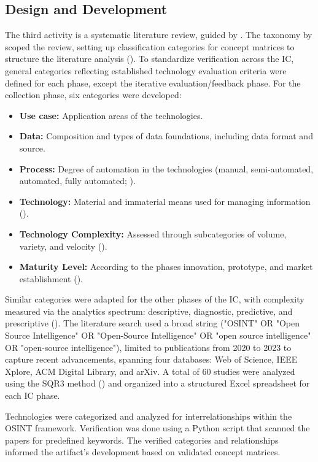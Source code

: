 \documentclass[10pt]{article}
\begin{document}
\subsection{Design and Development}
The third activity is a systematic literature review, guided by \textcite{Cleven.2009}.  The taxonomy by \cite{Cooper.1988} scoped the review, setting up classification categories for concept matrices to structure the literature analysis (\cite{Webster.2002}).
To standardize verification across the IC, general categories reflecting established technology evaluation criteria were defined for each phase, except the iterative evaluation/feedback phase. For the collection phase, six categories were developed:
\begin{itemize}
    \item \textbf{Use case:} Application areas of the technologies.
    \item \textbf{Data:} Composition and types of data foundations, including data format and source.
    \item \textbf{Process:} Degree of automation in the technologies (manual, semi-automated, automated, fully automated; \cite{Duncheon.2002, Billings.1997, Endsley.1999}).
    \item \textbf{Technology:} Material and immaterial means used for managing information (\cite{Bleck.2004}).
    \item \textbf{Technology Complexity:} Assessed through subcategories of volume, variety, and velocity (\cite{Elgendy.2014}).
    \item \textbf{Maturity Level:} According to the phases innovation, prototype, and  market establishment (\cite{Stich.2022}).
\end{itemize}

Similar categories were adapted for the other phases of the IC, with complexity measured via the analytics spectrum: descriptive, diagnostic, predictive, and prescriptive (\cite{Delen.2013}). The literature search used a broad string ("OSINT" OR "Open Source Intelligence" OR "Open-Source Intelligence" OR "open source intelligence" OR "open-source intelligence"), limited to publications from 2020 to 2023 to capture recent advancements, spanning four databases: Web of Science, IEEE Xplore, ACM Digital Library, and arXiv. A total of 60 studies were analyzed using the SQR3 method (\cite{Robinson.1970}) and organized into a structured Excel spreadsheet for each IC phase.

Technologies were categorized and analyzed for interrelationships within the OSINT framework. Verification was done using a Python script that scanned the papers for predefined keywords. The verified categories and relationships informed the artifact's development based on validated concept matrices.
\end{document}
